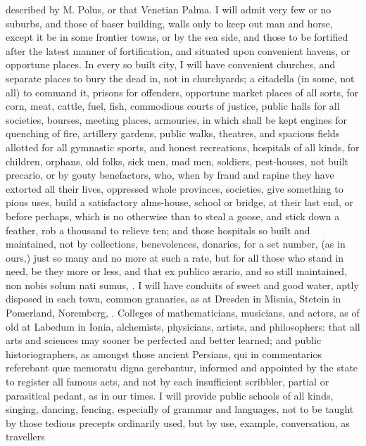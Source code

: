 {described by M. Polus, or that Venetian Palma. I will admit very few or
no suburbs, and those of baser building, walls only to keep out man and
horse, except it be in some frontier towns, or by the sea side, and
those to be fortified  after the latest manner of fortification,
and situated upon convenient havens, or opportune places. In every so
built city, I will have convenient churches, and separate places to
bury the dead in, not in churchyards; a citadella (in some, not all) to
command it, prisons for offenders, opportune market places of all
sorts, for corn, meat, cattle, fuel, fish, commodious courts of
justice, public halls for all societies, bourses, meeting places,
armouries, in which shall be kept engines for quenching of fire,
artillery gardens, public walks, theatres, and spacious fields allotted
for all gymnastic sports, and honest recreations, hospitals of all
kinds, for children, orphans, old folks, sick men, mad men, soldiers,
pest-houses, \etc{} not built precario, or by gouty benefactors, who, when
by fraud and rapine they have extorted all their lives, oppressed whole
provinces, societies, \etc{} give something to pious uses, build a
satisfactory alms-house, school or bridge, \etc{} at their last end, or
before perhaps, which is no otherwise than to steal a goose, and stick
down a feather, rob a thousand to relieve ten; and those hospitals so
built and maintained, not by collections, benevolences, donaries, for a
set number, (as in ours,) just so many and no more at such a rate, but
for all those who stand in need, be they more or less, and that ex
publico \ae{}rario, and so still maintained, non nobis solum nati sumus,
\etc{}. I will have conduits of sweet and good water, aptly disposed in
each town, common  granaries, as at Dresden in Misnia, Stetein in
Pomerland, Noremberg, \etc{}. Colleges of mathematicians, musicians, and
actors, as of old at Labedum in Ionia, alchemists, physicians,
artists, and philosophers: that all arts and sciences may sooner be
perfected and better learned; and public historiographers, as amongst
those ancient Persians, qui in commentarios referebant qu\ae{}
memoratu digna gerebantur, informed and appointed by the state to
register all famous acts, and not by each insufficient scribbler,
partial or parasitical pedant, as in our times. I will provide public
schools of all kinds, singing, dancing, fencing, \etc{} especially of
grammar and languages, not to be taught by those tedious precepts
ordinarily used, but by use, example, conversation, as travellers
}
